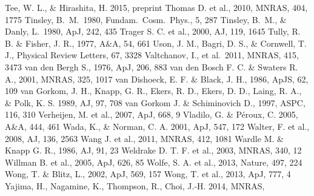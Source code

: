 \begin{thebibliography}{99}
\begin{multicols}{2}
{
   	Tee, W. L., \& Hirashita, H. 2015, preprint
	Thomas D. et al., 2010, MNRAS, 404, 1775
	Tinsley, B.~M.\ 1980, Fundam.\ Cosm.\ Phys., 5, 287 
	Tinsley, B.~M., \& Danly, L.\ 1980, ApJ, 242, 435 
	Trager S. C. et al., 2000, AJ, 119, 1645
	Tully, R. B. \& Fisher, J. R., 1977, A\&A, 54, 661
    	Uson, J. M., Bagri, D. S., \& Cornwell, T. J., Physical Review Letters, 67, 3328
    	Valtchanov, I., et al.\ 2011, MNRAS, 415, 3473
	van den Bergh S., 1976, ApJ, 206, 883
	van den Bosch F. C. \& Swaters R. A., 2001, MNRAS, 325, 1017
      van Dishoeck, E. F. \& Black, J. H., 1986, ApJS, 62, 109
    	van Gorkom, J. H., Knapp, G. R., Ekers, R. D., Ekers, D. D.,
    	Laing, R. A., \& Polk, K. S. 1989, AJ, 97, 708
	van Gorkom J. \& Schiminovich D., 1997, ASPC, 116, 310
	Verheijen, M. et al., 2007, ApJ, 668, 9
    	Vladilo, G. \& P\'{e}roux, C. 2005, A\&A, 444, 461
   	Wada, K., \& Norman, C. A. 2001, ApJ, 547, 172
	Walter, F. et al., 2008, AJ, 136, 2563
	Wang J. et al., 2011, MNRAS, 412, 1081
	Wardle M. \& Knapp G. R., 1986, AJ, 91, 23
	Weldrake D. T. F. et al., 2003, MNRAS, 340, 12
	Willman B. et al., 2005, ApJ, 626, 85
	Wolfe, S. A. et al., 2013, Nature, 497, 224
	Wong, T. \& Blitz, L., 2002, ApJ, 569, 157
	Wong, T. et al., 2013, ApJ, 777, 4
   	Yajima, H., Nagamine, K., Thompson, R., Choi, J.-H. 2014, MNRAS,
}
\end{multicols}
\end{thebibliography}
